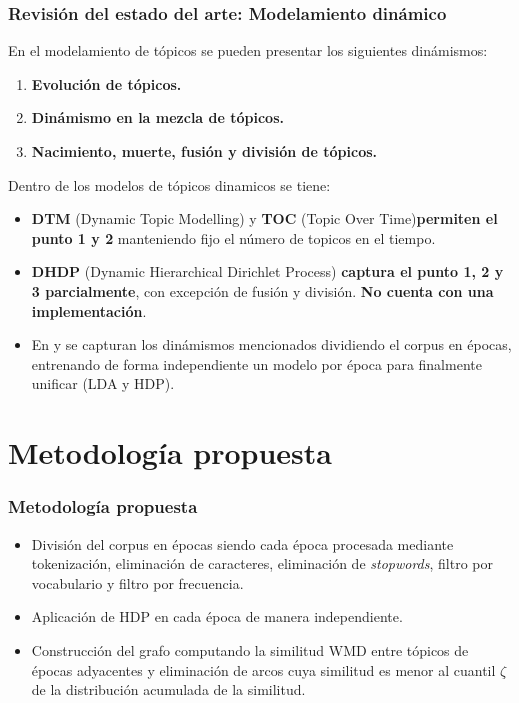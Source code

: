 \documentclass[
	spanish, %
	aspectratio=43, %
	hyperref={pdfencoding=auto,psdextra},
	xcolor={dvipsnames,table,usenames},
]{beamer}
\begin{document}
\begin{frame}[t]
\frametitle{Revisión del estado del arte: Modelamiento dinámico}
En el modelamiento de tópicos se pueden presentar los siguientes dinámismos:

\begin{enumerate}
  \item \textbf{Evolución de tópicos.}
  \item \textbf{Dinámismo en la mezcla de tópicos.}
  \item \textbf{Nacimiento, muerte, fusión y división de tópicos.}
\end{enumerate}

Dentro de los modelos de tópicos dinamicos se tiene:
\begin{itemize}
  \item \textbf{DTM} (Dynamic Topic Modelling)\cite{blei2006dynamic} y \textbf{TOC} (Topic Over Time)\textbf{permiten el punto 1 y 2} manteniendo fijo el número de topicos en el tiempo.
  \item \textbf{DHDP} (Dynamic Hierarchical Dirichlet Process)\cite{ahmed2012timeline} \textbf{captura el punto 1, 2 y 3 parcialmente}, con excepción de fusión y división. \textbf{No cuenta con una implementación}.\\
  \item En \cite{wilson2011tracking} y \cite{beykikhoshk2018discovering} se capturan los dinámismos mencionados dividiendo el corpus en épocas, entrenando de forma independiente un modelo por época para finalmente unificar (LDA y HDP).
\end{itemize}


\end{frame}


\section{Metodología propuesta}
\begin{frame}[t]
\frametitle{Metodología propuesta}
\begin{itemize}
  \item División del corpus en épocas siendo cada época procesada mediante tokenización, eliminación de caracteres, eliminación de \textit{stopwords}, filtro por vocabulario y filtro por frecuencia. 
  \item Aplicación de HDP en cada época de manera independiente. 
  \item Construcción del grafo computando la similitud WMD entre tópicos de épocas adyacentes y eliminación de arcos cuya similitud es menor al cuantil $\zeta$ de la distribución acumulada de la similitud.
\end{itemize}

\vspace*{-0.2in}

\end{frame}
\end{document}
